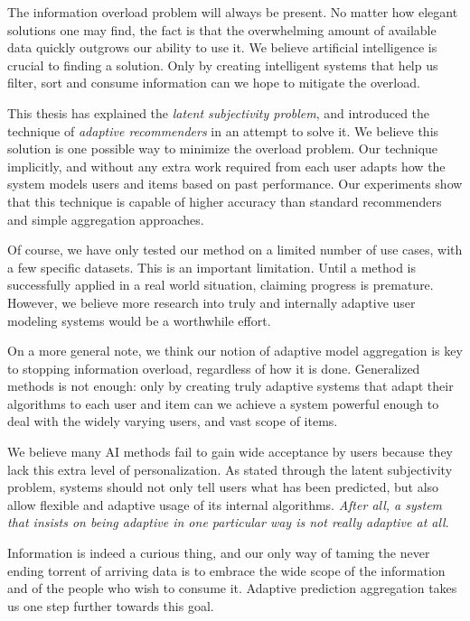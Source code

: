 The information overload problem will always be present.
No matter how elegant solutions one may find,
the fact is that the overwhelming amount of available data
quickly outgrows our ability to use it.
We believe artificial intelligence is crucial to finding a solution.
Only by creating intelligent systems that 
help us filter, sort and consume information can we hope 
to mitigate the overload.

This thesis has explained the \emph{latent subjectivity problem},
and introduced the technique of \emph{adaptive recommenders}
in an attempt to solve it.
We believe this solution is one possible way to minimize the overload problem.
Our technique implicitly, and without any extra work required from each user
adapts how the system models users and items based on past performance.
Our experiments show that this technique is capable of higher accuracy
than standard recommenders and simple aggregation approaches.

Of course, we have only tested our method on a limited 
number of use cases, with a few specific datasets.
This is an important limitation.
Until a method is successfully applied in a real world
situation, claiming progress is premature.
However, we believe more research into 
truly and internally adaptive user modeling systems
would be a worthwhile effort.

On a more general note, we think our notion of adaptive model
aggregation is key to stopping information overload,
regardless of how it is done.
Generalized methods is not enough: only
by creating truly adaptive systems that adapt their
algorithms to each user and item can we achieve a 
system powerful enough to deal with the widely
varying users, and vast scope of items.

We believe many AI methods fail to gain wide acceptance by users
because they lack this extra level of personalization.
As stated through the latent subjectivity problem,
systems should not only tell users what has been predicted,
but also allow flexible and adaptive usage of its internal algorithms.
\emph{After all, a system that insists on being adaptive
in one particular way is not really adaptive at all}.

\hr

\noindent
Information is indeed a curious thing,
and our only way of taming the never ending torrent of 
arriving data is to embrace the wide scope of the information
and of the people who wish to consume it.
Adaptive prediction aggregation takes us one step further towards this goal.

